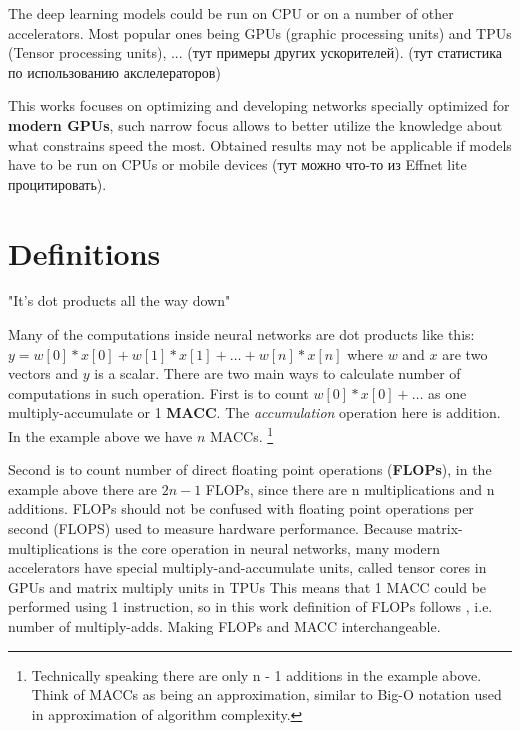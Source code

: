 The deep learning models could be run on CPU or on a number of other accelerators. Most popular ones being GPUs (graphic processing units) and TPUs (Tensor processing units), ... (тут примеры других ускорителей). (тут статистика по использованию акслелераторов)

This works focuses on optimizing and developing networks specially optimized for \textbf{modern GPUs}, such narrow focus allows to better utilize the knowledge about what constrains speed the most. Obtained results may not be applicable if models have to be run on CPUs or mobile devices (тут можно что-то из Effnet lite процитировать). 




\section{Definitions}

"It’s dot products all the way down" 

Many of the computations inside neural networks are dot products like this: $y = w[0]*x[0] + w[1]*x[1] + \ldots + w[n] * x[n]$ where $w$ and $x$ are two vectors and $y$ is a scalar. There are two main ways to calculate number of computations in such operation. First is to count $ w[0] * x[0] + \ldots $ as one multiply-accumulate or 1 \textbf{MACC}. The \textit{accumulation} operation here is addition. In the example above we have $n$ MACCs. \footnote{Technically speaking there are only n - 1 additions in the example above. Think of MACCs as being an approximation, similar to Big-O notation used in approximation of algorithm complexity.}

Second is to count number of direct floating point operations (\textbf{FLOPs}), in the example above there are $2n - 1$ FLOPs, since there are n multiplications and n additions. FLOPs should not be confused with floating point operations per second (FLOPS) used to measure hardware performance. Because matrix-multiplications is the core operation in neural networks, many modern accelerators have special multiply-and-accumulate units, called tensor cores 
in GPUs and matrix multiply units in TPUs %
This means that 1 MACC could be performed using 1 instruction, so in this work definition of FLOPs follows \cite{zhang2018_shufflenet}, i.e. number of multiply-adds. Making FLOPs and MACC interchangeable.


